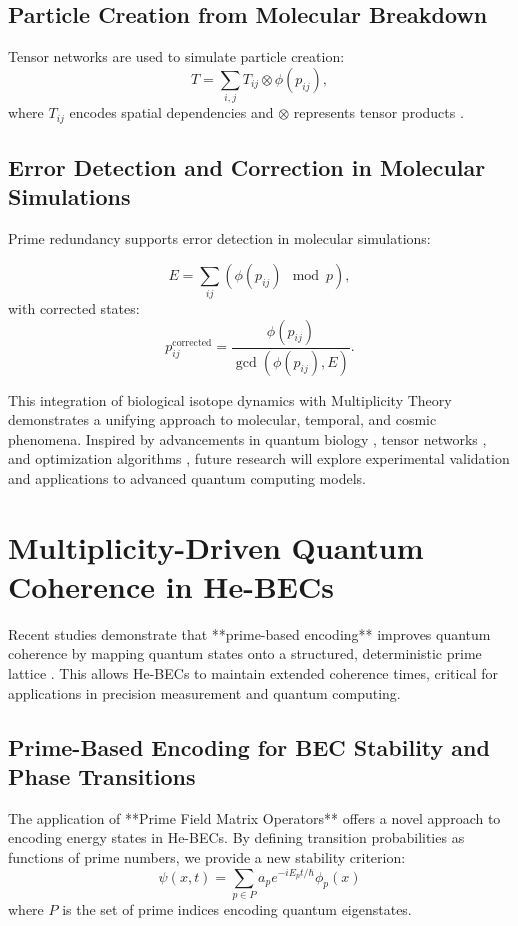 \documentclass{article}
\theoremstyle{plain}
\begin{document}
\subsection{Particle Creation from Molecular Breakdown}
Tensor networks are used to simulate particle creation:
\begin{equation}
T = \sum_{i,j} T_{ij} \otimes \phi(p_{ij}),
\end{equation}
where \( T_{ij} \) encodes spatial dependencies and \( \otimes \) represents tensor products \cite{TensorNetworks2022}.

\subsection{Error Detection and Correction in Molecular Simulations}
Prime redundancy supports error detection in molecular simulations:

\begin{equation}
E = \sum_{ij} (\phi(p_{ij}) \mod p),
\end{equation}
with corrected states:
\begin{equation}
p_{ij}^{\text{corrected}} = \frac{\phi(p_{ij})}{\gcd(\phi(p_{ij}), E)}.
\end{equation}

This integration of biological isotope dynamics with Multiplicity Theory demonstrates a unifying approach to molecular, temporal, and cosmic phenomena. Inspired by advancements in quantum biology \cite{QuantumBiology2017}, tensor networks \cite{TensorNetworks2022}, and optimization algorithms \cite{QuantumOptimization2023}, future research will explore experimental validation and applications to advanced quantum computing models.

\section{Multiplicity-Driven Quantum Coherence in He-BECs}
Recent studies demonstrate that **prime-based encoding** improves quantum coherence by mapping quantum states onto a structured, deterministic prime lattice \cite{neuromorphic_AGI}. This allows He-BECs to maintain extended coherence times, critical for applications in precision measurement and quantum computing.

\subsection{Prime-Based Encoding for BEC Stability and Phase Transitions}
The application of **Prime Field Matrix Operators** \cite{multiplicative_operators} offers a novel approach to encoding energy states in He-BECs. By defining transition probabilities as functions of prime numbers, we provide a new stability criterion:
\begin{equation}
    \psi(x, t) = \sum_{p \in P} a_p e^{-i E_p t / \hbar} \phi_p(x)
\end{equation}
where $P$ is the set of prime indices encoding quantum eigenstates.
\end{document}
